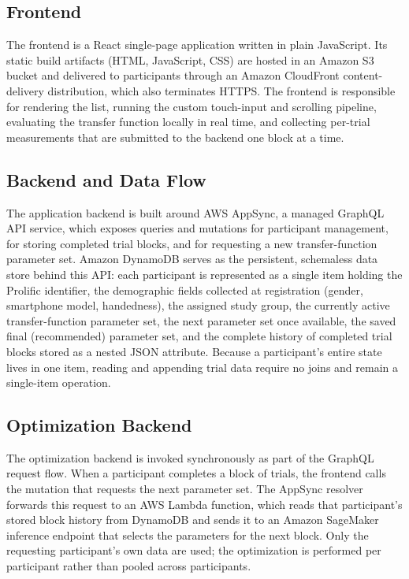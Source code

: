 \subsection{Frontend}

The frontend is a React single-page application written in plain JavaScript. Its static build artifacts (HTML, JavaScript, CSS) are hosted in an Amazon S3 bucket and delivered to participants through an Amazon CloudFront content-delivery distribution, which also terminates HTTPS. The frontend is responsible for rendering the list, running the custom touch-input and scrolling pipeline, evaluating the transfer function locally in real time, and collecting per-trial measurements that are submitted to the backend one block at a time.

\subsection{Backend and Data Flow}

The application backend is built around AWS AppSync, a managed GraphQL API service, which exposes queries and mutations for participant management, for storing completed trial blocks, and for requesting a new transfer-function parameter set. Amazon DynamoDB serves as the persistent, schemaless data store behind this API: each participant is represented as a single item holding the Prolific identifier, the demographic fields collected at registration (gender, smartphone model, handedness), the assigned study group, the currently active transfer-function parameter set, the next parameter set once available, the saved final (recommended) parameter set, and the complete history of completed trial blocks stored as a nested JSON attribute. Because a participant's entire state lives in one item, reading and appending trial data require no joins and remain a single-item operation.

\subsection{Optimization Backend}

The optimization backend is invoked synchronously as part of the GraphQL request flow. When a participant completes a block of trials, the frontend calls the mutation that requests the next parameter set. The AppSync resolver forwards this request to an AWS Lambda function, which reads that participant's stored block history from DynamoDB and sends it to an Amazon SageMaker inference endpoint that selects the parameters for the next block. Only the requesting participant's own data are used; the optimization is performed per participant rather than pooled across participants.

